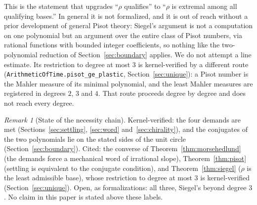 \documentclass[11pt]{amsart}
\theoremstyle{plain}
\theoremstyle{definition}
\theoremstyle{remark}
\newtheorem{remark}[theorem]{Remark}
\begin{document}
This is the statement that upgrades ``$\rho$ qualifies'' to ``$\rho$ is extremal among all qualifying bases.'' In general it is not formalized, and it is out of reach without a prior development of general Pisot theory: Siegel's argument is not a computation on one polynomial but an argument over the entire class of Pisot numbers, via rational functions with bounded integer coefficients, so nothing like the two-polynomial reduction of Section~\ref{sec:boundary} applies. We do not attempt a line estimate. Its restriction to degree at most $3$ is kernel-verified by a different route (\texttt{ArithmeticOfTime.pisot\_ge\_plastic}, Section~\ref{sec:unique}): a Pisot number is the Mahler measure of its minimal polynomial, and the least Mahler measures are registered in degrees $2$, $3$ and $4$. That route proceeds degree by degree and does not reach every degree.

\begin{remark}[State of the necessity chain]
\label{rem:necessity-state}
Kernel-verified: the four demands are met (Sections~\ref{sec:settling}, \ref{sec:word} and~\ref{sec:chirality}), and the conjugates of the two polynomials lie on the stated sides of the unit circle (Section~\ref{sec:boundary}). Cited: the converse of Theorem~\ref{thm:morsehedlund} (the demands force a mechanical word of irrational slope), Theorem~\ref{thm:pisot} (settling is equivalent to the conjugate condition), and Theorem~\ref{thm:siegel} ($\rho$ is the least admissible base), whose restriction to degree at most $3$ is kernel-verified (Section~\ref{sec:unique}). Open, as formalizations: all three, Siegel's beyond degree $3$. No claim in this paper is stated above these labels.
\end{remark}
\end{document}
